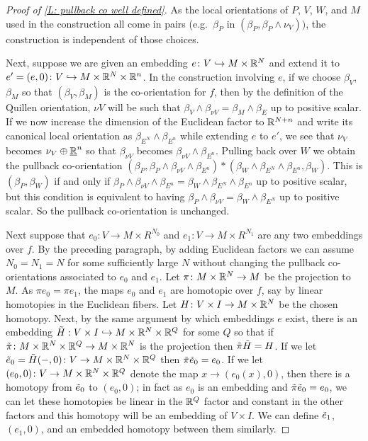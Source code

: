 \begin{proof}[Proof of \cref{L: pullback co well defined}]
	As the local orientations of $P$, $V$, $W$, and $M$ used in the construction all come in pairs (e.g.\ $\beta_P$ in $(\beta_P,\beta_P \wedge \nu_V))$, the construction is independent of those choices.

	Next, suppose we are given an embedding $e \colon V \hookrightarrow M \times \mathbb{R}^N$ and extend it to $e' = (e,0) \colon V \hookrightarrow M \times \mathbb{R}^N \times \mathbb{R}^n$.
	In the construction involving $e$, if we choose $\beta_V$, $\beta_M$ so that $(\beta_V,\beta_M)$ is the co-orientation for $f$, then by the definition of the Quillen orientation, $\nu V$ will be such that $\beta_V \wedge \beta_{\nu V} = \beta_M \wedge \beta_E$ up to positive scalar.
	If we now increase the dimension of the Euclidean factor to $\mathbb{R}^{N+n}$ and write its canonical local orientation as $\beta_{E^N} \wedge \beta_{E^n}$ while extending $e$ to $e'$, we see that $\nu_V$ becomes $\nu_V \oplus \underline{\mathbb{R}}^n$ so that $\beta_{\nu V}$ becomes $\beta_{\nu V} \wedge \beta_{E^n}$.
	Pulling back over $W$ we obtain the pullback co-orientation $(\beta_P,\beta_P \wedge \beta_{\nu V} \wedge \beta_{E^n})*(\beta_W \wedge \beta_{E^N} \wedge \beta_{E^n},\beta_W)$.
	This is $(\beta_P,\beta_W)$ if and only if $\beta_P \wedge \beta_{\nu V} \wedge \beta_{E^n} = \beta_W \wedge \beta_{E^N} \wedge \beta_{E^n}$ up to positive scalar, but this condition is equivalent to having $\beta_P \wedge \beta_{\nu V} = \beta_W \wedge \beta_{E^N}$ up to positive scalar.
	So the pullback co-orientation is unchanged.

	Next suppose that $e_0 \colon V \to M \times R^{N_0}$ and $e_1 \colon V \to M \times R^{N_1}$ are any two embeddings over $f$.
	By the preceding paragraph, by adding Euclidean factors we can assume $N_0 = N_1 = N$ for some sufficiently large $N$ without changing the pullback co-orientations associated to $e_0$ and $e_1$.
	Let $\pi \colon M \times \mathbb{R}^N \to M$ be the projection to $M$.
	As $\pi e_0 = \pi e_1$, the maps $e_0$ and $e_1$ are homotopic over $f$, say by linear homotopies in the Euclidean fibers.
	Let $H \colon V \times I \to M \times \mathbb{R}^N$ be the chosen homotopy.
	Next, by the same argument by which embeddings $e$ exist, there is an embedding $\tilde H: V \times I \hookrightarrow M \times \mathbb{R}^N \times \mathbb{R}^Q$ for some $Q$ so that if $\tilde \pi \colon M \times \mathbb{R}^N \times \mathbb{R}^Q \to M \times \mathbb{R}^N$ is the projection then $\tilde \pi \tilde H = H$.
	If we let $\tilde e_0 = \tilde H(-,0) \colon V \to M \times \mathbb{R}^N \times \mathbb{R}^Q$ then $\tilde \pi \tilde e_0 = e_0$.
	If we let $(e_0,0) \colon V \to M \times \mathbb{R}^N \times \mathbb{R}^Q$ denote the map $x \to (e_0(x), 0)$, then there is a homotopy from $\tilde e_0$ to $(e_0,0)$; in fact as $e_0$ is an embedding and $\tilde \pi \tilde e_0 = e_0$, we can let these homotopies be linear in the $\mathbb{R}^Q$ factor and constant in the other factors and this homotopy will be an embedding of $V \times I$.
	We can define $\tilde e_1$, $(e_1,0)$, and an embedded homotopy between them similarly.


\end{proof}
